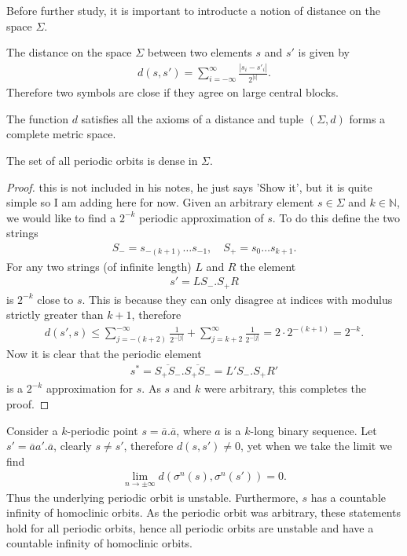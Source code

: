 Before further study, it is important to introducte a notion of distance on the space $\Sigma$.
\begin{definition}
	The distance on the space $\Sigma$ between two elements $s$ and $s'$ is given by
	\begin{align}
		d(s,s') = \sum_{i=-\infty }^{\infty } \frac{|s_i - s'_i |}{2^{|i|}}.
	\end{align}
Therefore two symbols are close if they agree on large central blocks.	
\end{definition}
\begin{remark}[]
	The function $d$ satisfies all the axioms of a distance and tuple $(\Sigma, d) $ forms a complete metric space. 
\end{remark}

\begin{proposition}
The set of all periodic orbits is dense in $\Sigma$.	
\end{proposition}
\begin{proof}
	{\color{blue} this is not included in his notes, he just says 'Show it', but it is quite simple so I am adding here for now.}
	Given an arbitrary element $s\in\Sigma$ and $k \in \mathbb{N}$, we would like to find a $2^{-k}$ periodic approximation of $s$. To do this define the two strings
	\begin{align}
		S_{-} = s_{-(k+1)}\ldots s_{-1}, \quad S_{+} = s_0 \ldots s_{k+1}.
	\end{align}
	For any two strings (of infinite length) $L$ and $R$ the element
	 \begin{align}
		s' = L S_{-}\bm{.} S_{+}R
	\end{align}
	is $2^{-k}$ close to $s$. This is because they can only disagree at indices with modulus strictly greater than $k+1$, therefore
	\begin{align}
		d(s',s) \leq \sum_{j=-(k+2)}^{-\infty }\frac{1}{2^{-|j|}} + \sum_{j=k+2}^{\infty } \frac{1}{2^{-|j|}} = 2\cdot 2^{-(k+1)} = 2^{-k}. 
	\end{align}
Now it is clear that the periodic element
\begin{align}
	s^{*} = \overline{S_{+}S_{-}} \bm{.} \overline{S_{+}S_{-}} = L' S_{-}\bm{.} S_{+}R'
\end{align}
is a $2^{-k}$ approximation for $s$. As $s$ and $k$ were arbitrary, this completes the proof.
\end{proof}


Consider a $k$-periodic point $s=\overline{a}\bm{.} \overline{a}$, where $a$ is a $k$-long binary sequence. Let $s' = \overline{a}a'\bm{.} \overline{a}$, clearly $s \neq s'$, therefore $d(s,s') \neq 0$, yet when we take the limit we find
\begin{align}
	\lim_{n\to \pm \infty }	d(\sigma^{n}(s), \sigma^{n}(s')) = 0.
\end{align}
Thus the underlying periodic orbit is unstable. Furthermore, $s$ has a countable infinity of homoclinic orbits. As the periodic orbit was arbitrary, these statements hold for all periodic orbits, hence all periodic orbits are unstable and have a countable infinity of homoclinic orbits.

